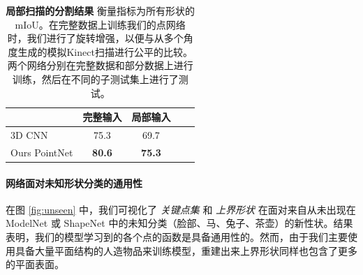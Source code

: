 \begin{table}[h!]
    \small
    \centering
    \begin{tabular}[width=\linewidth]{l|cccc}
    \hline
    ~ & 完整输入 & 局部输入 \\ \hline
    3D CNN & 75.3 & 69.7 \\ \hline
    Ours PointNet & \textbf{80.6} & \textbf{75.3}  \\ \hline
    \end{tabular}
    \caption{\textbf{局部扫描的分割结果} 衡量指标为所有形状的 mIoU。在完整数据上训练我们的点网络时，我们进行了旋转增强，以便与从多个角度生成的模拟Kinect扫描进行公平的比较。两个网络分别在完整数据和部分数据上进行训练，然后在不同的子测试集上进行了测试。}
    \label{tab:segmentation_partial}
\end{table}



\paragraph{网络面对未知形状分类的通用性}
在图 \ref{fig:unseen} 中，我们可视化了 \textit{关键点集} 和 \textit{上界形状} 在面对来自从未出现在 ModelNet 或 ShapeNet 中的未知分类（脸部、马、兔子、茶壶）的新性状。结果表明，我们的模型学习到的各个点的函数是具备通用性的。然而，由于我们主要使用具备大量平面结构的人造物品来训练模型，重建出来上界形状同样也包含了更多的平面表面。

 


